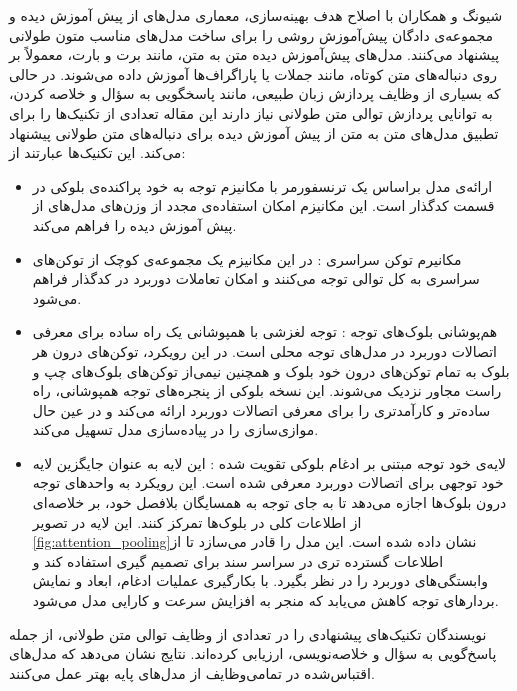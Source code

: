 شیونگ و همکاران با اصلاح هدف بهینه‌سازی، معماری مدل‌‌های از پیش آموزش دیده و مجموعه‌ی دادگان پیش‌آموزش
روشی را برای ساخت مدل‌های مناسب متون طولانی پیشنهاد می‌کنند. مدل‌های پيش‌آموزش دیده متن به متن، مانند برت و بارت، معمولاً بر روی دنباله‌های متن کوتاه، مانند جملات یا پاراگراف‌ها آموزش داده می‌شوند. در حالی که بسیاری از وظایف پردازش زبان طبیعی، مانند پاسخگویی به سؤال و خلاصه کردن، به توانایی پردازش توالی متن طولانی نیاز دارند این مقاله تعدادی از تکنیک‌ها را برای تطبیق مدل‌های متن به متن از پیش آموزش دیده برای دنباله‌های متن طولانی پیشنهاد می‌کند. این تکنیک‌ها عبارتند از:
\begin{itemize}
	\item{
		ارائه‌ی مدل براساس یک ترنسفورمر با 	مکانیزم توجه به خود پراکنده‌ی بلوکی
		در قسمت کدگذار است. این مکانیزم امکان استفاده‌ی مجدد از وزن‌های مدل‌های از پیش آموزش دیده را فراهم می‌کند.	
	}
	
	\item {
		مکانیرم توکن سراسری
		:
		در این مکانیزم یک مجموعه‌ی کوچک از توکن‌های سراسری به کل توالی توجه می‌کنند و امکان تعاملات دوربرد در کدگذار فراهم می‌شود.
	}
	\item{
		هم‌پوشانی بلوک‌های توجه
		: توجه لغزشی با همپوشانی یک راه ساده برای معرفی اتصالات دوربرد در مدل‌های توجه محلی است. در این رویکرد، توکن‌های درون هر بلوک به تمام توکن‌های درون خود بلوک و همچنین نیمی‌از توکن‌های بلوک‌های چپ و راست مجاور نزدیک می‌شوند. این نسخه بلوکی از پنجره‌های توجه همپوشانی، راه ساده‌تر و کارآمدتری را برای معرفی اتصالات دوربرد ارائه می‌کند و در عین حال موازی‌سازی را در پیاده‌سازی مدل تسهیل می‌کند.
		
	}
	\item{
		لایه‌ی خود توجه مبتنی بر ادغام بلوکی تقویت شده
		:
		این لایه به عنوان جایگزین لایه خود توجهی برای اتصالات دوربرد معرفی شده است. این رویکرد به واحدهای توجه درون بلوک‌ها اجازه می‌دهد تا به جای توجه به همسایگان بلافصل خود، بر خلاصه‌ای از اطلاعات کلی در بلوک‌ها تمرکز کنند. این لایه در تصویر \ref{fig:attention_pooling}نشان داده شده است. این مدل را قادر می‌سازد تا از اطلاعات گسترده تری در سراسر سند برای تصمیم گیری استفاده کند و وابستگی‌های دوربرد را در نظر بگیرد. با بکارگیری عملیات ادغام، ابعاد و نمایش بردارهای توجه کاهش می‌یابد که منجر به افزایش سرعت و کارایی مدل می‌شود.}
\end{itemize}
نویسندگان تکنیک‌های پیشنهادی را در تعدادی از وظایف توالی متن طولانی، از جمله پاسخ‌گویی به سؤال و خلاصه‌نویسی، ارزیابی کرده‌اند. نتایج نشان می‌دهد که مدل‌های اقتباس‌شده در تمامی‌وظایف از مدل‌های پایه بهتر عمل می‌کنند.
